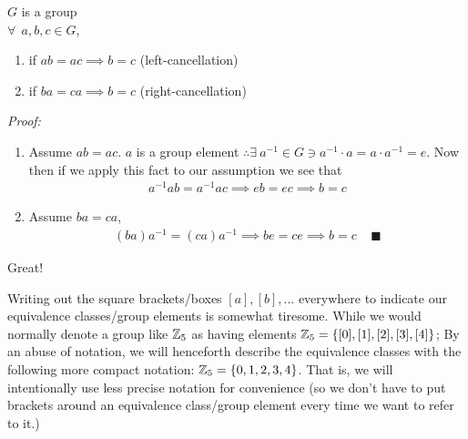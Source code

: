 \begin{lemma}
$G$ is a group\\
$\forall \ \ a,b,c \in G$,
\begin{enumerate}[label=\roman*)]
    \item if $ab=ac \implies b=c$      (left-cancellation)
    \item if $ba=ca \implies b=c$      (right-cancellation)
\end{enumerate}
\textit{Proof:}
\begin{enumerate}[label=\roman*)]
    \item Assume $ab=ac$. $a$ is a group element
    $\therefore \exists \ a^{-1}\in G \ni a^{-1}\cdot a = a\cdot a^{-1}=e$. Now then if we apply
    this fact to our assumption we see that
    \begin{align}
        a^{-1}ab=a^{-1}ac \implies eb=ec \implies b=c\nonumber
    \end{align}
    \item Assume $ba=ca$,
    \begin{align}
        (ba)a^{-1}=(ca)a^{-1} \implies be=ce \implies b=c \ \ \ \ \ \blacksquare \nonumber
    \end{align}
\end{enumerate}
\end{lemma}
Great!
\begin{notation}
Writing out the square brackets/boxes $[a],[b], ...$ everywhere to indicate our equivalence
classes/group elements is somewhat tiresome. While we would normally denote a group like ${\mathbb{Z}}_5$ as
having elements ${\mathbb{Z}}_5=\{[0],[1],[2],[3],[4]\}$; By an abuse of notation, we will henceforth describe
the equivalence classes with the following more compact notation: ${\mathbb{Z}}_5=\{0,1,2,3,4\}$. That is, we
will intentionally use less precise notation for convenience (so we don't have to put brackets
around an equivalence class/group element every time we want to refer to it.)
\end{notation}
